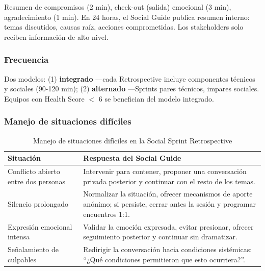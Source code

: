Resumen de compromisos (2 min), check-out (salida) emocional (3 min), agradecimiento (1 min). En 24 horas, el Social Guide publica resumen interno: temas discutidos, causas raíz, acciones comprometidas. Los stakeholders solo reciben información de alto nivel.

\subsubsection{Frecuencia}

Dos modelos: (1) \textbf{integrado} ---cada Retrospective incluye componentes técnicos y sociales (90-120 min); (2) \textbf{alternado} ---Sprints pares técnicos, impares sociales. Equipos con Health Score $<$ 6 se benefician del modelo integrado.

\subsubsection{Manejo de situaciones difíciles}
\begin{table}[h]
    \centering
    \small
    \begin{tabularx}{\textwidth}{|X|X|}
        \hline
        \textbf{Situación} & \textbf{Respuesta del Social Guide}                                                                                            \\
        \hline
        Conflicto abierto entre dos personas
                           & Intervenir para contener, proponer una conversación privada posterior y continuar con el resto de los temas.                   \\
        \hline
        Silencio prolongado
                           & Normalizar la situación, ofrecer mecanismos de aporte anónimo; si persiste, cerrar antes la sesión y programar encuentros 1:1. \\
        \hline
        Expresión emocional intensa
                           & Validar la emoción expresada, evitar presionar, ofrecer seguimiento posterior y continuar sin dramatizar.                      \\
        \hline
        Señalamiento de culpables
                           & Redirigir la conversación hacia condiciones sistémicas: “¿Qué condiciones permitieron que esto ocurriera?”.                    \\
        \hline
    \end{tabularx}
    \caption{Manejo de situaciones difíciles en la Social Sprint Retrospective}
    \label{tab:situaciones-dificiles-retro}
\end{table}

